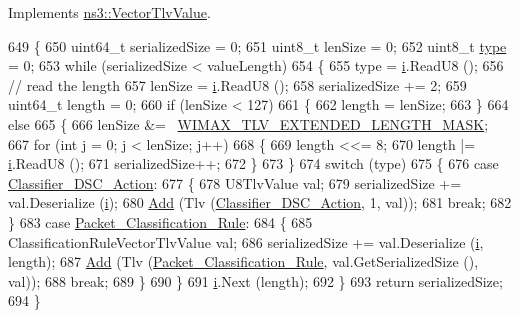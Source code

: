 Implements \hyperlink{classns3_1_1VectorTlvValue_a36f4f80c7740888f7b6b45c26e76d99e}{ns3\+::\+Vector\+Tlv\+Value}.


\begin{DoxyCode}
649 \{
650   uint64\_t serializedSize = 0;
651   uint8\_t lenSize = 0;
652   uint8\_t \hyperlink{visualizer-ideas_8txt_add98db9e15e2a58cf2b57623e7aa893a}{type} = 0;
653   \textcolor{keywordflow}{while} (serializedSize < valueLength)
654     \{
655       type = \hyperlink{bernuolliDistribution_8m_a6f6ccfcf58b31cb6412107d9d5281426}{i}.ReadU8 ();
656       \textcolor{comment}{// read the length}
657       lenSize = \hyperlink{bernuolliDistribution_8m_a6f6ccfcf58b31cb6412107d9d5281426}{i}.ReadU8 ();
658       serializedSize += 2;
659       uint64\_t length = 0;
660       \textcolor{keywordflow}{if} (lenSize < 127)
661         \{
662           length = lenSize;
663         \}
664       \textcolor{keywordflow}{else}
665         \{
666           lenSize &= ~\hyperlink{wimax-tlv_8h_a590060b4cac40c59bb72398847174fae}{WIMAX\_TLV\_EXTENDED\_LENGTH\_MASK};
667           \textcolor{keywordflow}{for} (\textcolor{keywordtype}{int} j = 0; j < lenSize; j++)
668             \{
669               length <<= 8;
670               length |= \hyperlink{bernuolliDistribution_8m_a6f6ccfcf58b31cb6412107d9d5281426}{i}.ReadU8 ();
671               serializedSize++;
672             \}
673         \}
674       \textcolor{keywordflow}{switch} (type)
675         \{
676         \textcolor{keywordflow}{case} \hyperlink{classns3_1_1CsParamVectorTlvValue_a72ca87bab4986bec8ee954c8d223ca2bad2d71189ca938c2c6a716b9d4a996c31}{Classifier\_DSC\_Action}:
677           \{
678             U8TlvValue val;
679             serializedSize += val.Deserialize (\hyperlink{bernuolliDistribution_8m_a6f6ccfcf58b31cb6412107d9d5281426}{i});
680             \hyperlink{classns3_1_1VectorTlvValue_a9a422b96698c94e7bb4705026e236f35}{Add} (Tlv (\hyperlink{classns3_1_1CsParamVectorTlvValue_a72ca87bab4986bec8ee954c8d223ca2bad2d71189ca938c2c6a716b9d4a996c31}{Classifier\_DSC\_Action}, 1, val));
681             \textcolor{keywordflow}{break};
682           \}
683         \textcolor{keywordflow}{case} \hyperlink{classns3_1_1CsParamVectorTlvValue_a72ca87bab4986bec8ee954c8d223ca2ba56aa6665cbc24e0799ae7c6d056addc8}{Packet\_Classification\_Rule}:
684           \{
685             ClassificationRuleVectorTlvValue val;
686             serializedSize += val.Deserialize (\hyperlink{bernuolliDistribution_8m_a6f6ccfcf58b31cb6412107d9d5281426}{i}, length);
687             \hyperlink{classns3_1_1VectorTlvValue_a9a422b96698c94e7bb4705026e236f35}{Add} (Tlv (\hyperlink{classns3_1_1CsParamVectorTlvValue_a72ca87bab4986bec8ee954c8d223ca2ba56aa6665cbc24e0799ae7c6d056addc8}{Packet\_Classification\_Rule}, val.GetSerializedSize (), 
      val));
688             \textcolor{keywordflow}{break};
689           \}
690         \}
691       \hyperlink{bernuolliDistribution_8m_a6f6ccfcf58b31cb6412107d9d5281426}{i}.Next (length);
692     \}
693   \textcolor{keywordflow}{return} serializedSize;
694 \}
\end{DoxyCode}


